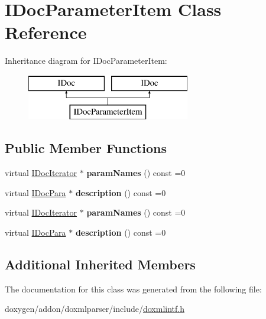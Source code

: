 \hypertarget{class_i_doc_parameter_item}{}\section{I\+Doc\+Parameter\+Item Class Reference}
\label{class_i_doc_parameter_item}
Inheritance diagram for I\+Doc\+Parameter\+Item\+:\begin{figure}[H]
\begin{center}
\leavevmode
\includegraphics[height=2.000000cm]{class_i_doc_parameter_item}
\end{center}
\end{figure}
\subsection*{Public Member Functions}
\begin{DoxyCompactItemize}
\item 
\mbox{\label{class_i_doc_parameter_item_a975cd22fb6754a38c92c147fe51a5018}} 
virtual \mbox{\hyperlink{class_i_doc_iterator}{I\+Doc\+Iterator}} $\ast$ {\bfseries param\+Names} () const =0
\item 
\mbox{\label{class_i_doc_parameter_item_aa98dfbbd070408ec3c385fe0acdc4b3f}} 
virtual \mbox{\hyperlink{class_i_doc_para}{I\+Doc\+Para}} $\ast$ {\bfseries description} () const =0
\item 
\mbox{\label{class_i_doc_parameter_item_a975cd22fb6754a38c92c147fe51a5018}} 
virtual \mbox{\hyperlink{class_i_doc_iterator}{I\+Doc\+Iterator}} $\ast$ {\bfseries param\+Names} () const =0
\item 
\mbox{\label{class_i_doc_parameter_item_aa98dfbbd070408ec3c385fe0acdc4b3f}} 
virtual \mbox{\hyperlink{class_i_doc_para}{I\+Doc\+Para}} $\ast$ {\bfseries description} () const =0
\end{DoxyCompactItemize}
\subsection*{Additional Inherited Members}


The documentation for this class was generated from the following file\+:\begin{DoxyCompactItemize}
\item 
doxygen/addon/doxmlparser/include/\mbox{\hyperlink{include_2doxmlintf_8h}{doxmlintf.\+h}}\end{DoxyCompactItemize}

